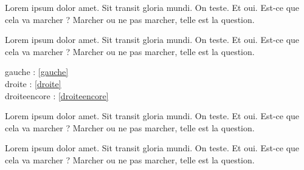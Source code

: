 \documentclass[twoside]{book}
\begin{document}
\begin{pairs}
\begin{Leftside}
\beginnumbering
\pstart
Lorem ipsum dolor amet. Sit transit gloria mundi.
On teste. Et oui. Est-ce que cela va marcher ? Marcher ou ne pas marcher, telle est la question.
\pend
\endnumbering
\end{Leftside}

\begin{Rightside}
\beginnumbering
\pstart
Lorem ipsum dolor amet. Sit transit gloria mundi.
On teste. Et oui. Est-ce que cela va marcher ? Marcher ou ne pas marcher, telle est la question.
\pend
\endnumbering
\end{Rightside}
\end{pairs}

\Columns


gauche : \ref{gauche}\\
droite : \ref{droite}\\
droiteencore : \ref{droiteencore}
\begin{pairs}
\begin{Leftside}
\beginnumbering
\pstart
Lorem ipsum dolor amet. Sit transit gloria mundi.
On teste. Et oui. Est-ce que cela va marcher ? Marcher ou ne pas marcher, telle est la question.
\pend
\endnumbering
\end{Leftside}

\begin{Rightside}
\beginnumbering
\pstart
Lorem ipsum dolor amet. Sit transit gloria mundi.
On teste. Et oui. Est-ce que cela va marcher ? Marcher ou ne pas marcher, telle est la question.
\pend
\endnumbering
\end{Rightside}
\end{pairs}
\Columns
\end{document}

